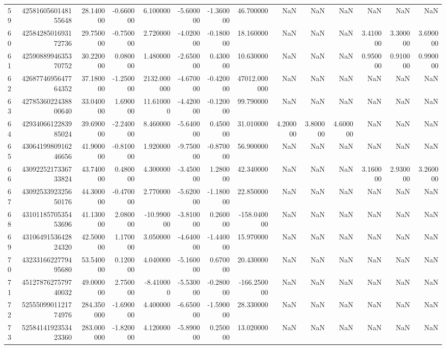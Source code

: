 \begin{tabular}{lrrrrrrrrrrrrr}
59 & 4258160560148155648 & 28.140000 & -0.660000 & 6.100000 & -5.600000 & -1.360000 & 46.700000 & NaN & NaN & NaN & NaN & NaN & NaN \\
60 & 4258428501693172736 & 29.750000 & -0.750000 & 2.720000 & -4.020000 & -0.180000 & 18.160000 & NaN & NaN & NaN & 3.410000 & 3.300000 & 3.690000 \\
61 & 4259088994635370752 & 30.220000 & 0.080000 & 1.480000 & -2.650000 & 0.430000 & 10.630000 & NaN & NaN & NaN & 0.950000 & 0.910000 & 0.990000 \\
62 & 4268774695647764352 & 37.180000 & -1.250000 & 2132.000000 & -4.670000 & -0.420000 & 47012.000000 & NaN & NaN & NaN & NaN & NaN & NaN \\
63 & 4278536022438800640 & 33.040000 & 1.690000 & 11.610000 & -4.420000 & -0.120000 & 99.790000 & NaN & NaN & NaN & NaN & NaN & NaN \\
64 & 4293406612283985024 & 39.690000 & -2.240000 & 8.460000 & -5.640000 & 0.450000 & 31.010000 & 4.200000 & 3.800000 & 4.600000 & NaN & NaN & NaN \\
65 & 4306419980916246656 & 41.900000 & -0.810000 & 1.920000 & -9.750000 & -0.870000 & 56.900000 & NaN & NaN & NaN & NaN & NaN & NaN \\
66 & 4309225217336733824 & 43.740000 & 0.480000 & 4.300000 & -3.450000 & 1.280000 & 42.340000 & NaN & NaN & NaN & 3.160000 & 2.930000 & 3.260000 \\
67 & 4309253392325650176 & 44.300000 & -0.470000 & 2.770000 & -5.620000 & -1.180000 & 22.850000 & NaN & NaN & NaN & NaN & NaN & NaN \\
68 & 4310118570535453696 & 41.130000 & 2.080000 & -10.990000 & -3.810000 & 0.260000 & -158.040000 & NaN & NaN & NaN & NaN & NaN & NaN \\
69 & 4310649153642824320 & 42.500000 & 1.170000 & 3.050000 & -4.640000 & -1.440000 & 15.970000 & NaN & NaN & NaN & NaN & NaN & NaN \\
70 & 4323316622779495680 & 53.540000 & 0.120000 & 4.040000 & -5.160000 & 0.670000 & 20.430000 & NaN & NaN & NaN & NaN & NaN & NaN \\
71 & 4512787627579740032 & 49.000000 & 2.750000 & -8.410000 & -5.530000 & -0.280000 & -166.250000 & NaN & NaN & NaN & NaN & NaN & NaN \\
72 & 5255509901121774976 & 284.350000 & -1.690000 & 4.400000 & -6.650000 & -1.590000 & 28.330000 & NaN & NaN & NaN & NaN & NaN & NaN \\
73 & 5258414192353423360 & 283.000000 & -1.820000 & 4.120000 & -5.890000 & 0.250000 & 13.020000 & NaN & NaN & NaN & NaN & NaN & NaN \\

\end{tabular}

